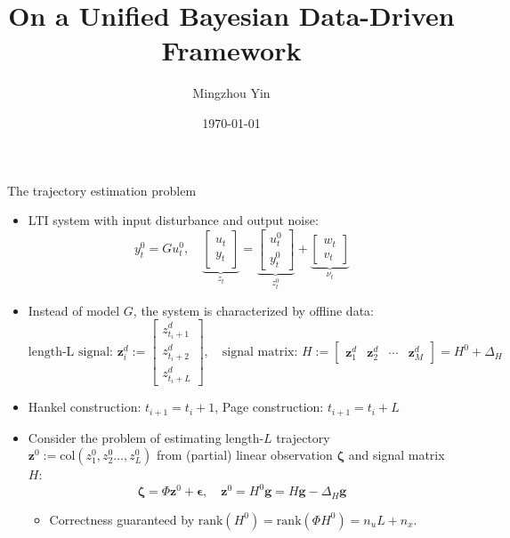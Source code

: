 \documentclass[smaller,aspectratio=169]{beamer}        %
\author[M Yin]{Mingzhou Yin}
\title{On a Unified Bayesian Data-Driven Framework}
\date{\today}
\newcommand{\col}[1]{\mathrm{col}\left(#1\right)}
\newcommand{\rank}[1]{\mathrm{rank}\left(#1\right)}
\begin{document}
\maketitle

\begin{frame}[fragile]{The trajectory estimation problem}
\begin{itemize}
    \item LTI system with input disturbance and output noise:
    \[y_t^0=Gu_t^0,\quad
    \underbrace{\begin{bmatrix}
        u_t\\y_t
    \end{bmatrix}}_{z_t}=
    \underbrace{\begin{bmatrix}
        u_t^0\\y_t^0
    \end{bmatrix}}_{z_t^0}+
    \underbrace{\begin{bmatrix}
        w_t\\v_t
    \end{bmatrix}}_{\nu_t}
    \]
    
    \vspace{-1em}
    
    \item Instead of model $G$, the system is characterized by offline data:
    \[\text{length-L signal: }\mathbf{z}^d_i := \begin{bmatrix}
        z^d_{t_i+1}\\z^d_{t_i+2}\\z^d_{t_i+L}
    \end{bmatrix},\quad\text{signal matrix: }H:= \begin{bmatrix}\mathbf{z}^d_1&\mathbf{z}^d_2&\cdots&\mathbf{z}^d_M\end{bmatrix}=H^0+\Delta_H\]
    \item Hankel construction: $t_{i+1}=t_i+1$, Page construction: $t_{i+1}=t_i+L$
    \pause
    \item Consider the problem of estimating length-$L$ trajectory $\mathbf{z}^0 := \col{z_1^0,z_2^0\dots,z_L^0}$ from (partial) linear observation $\boldsymbol{\zeta}$ and signal matrix $H$:
    \[\boldsymbol{\zeta} = \Phi\mathbf{z}^0 + \boldsymbol{\epsilon},\quad \mathbf{z}^0=H^0\mathbf{g}=H\mathbf{g}-\Delta_H\mathbf{g}\]
    
    \vspace{-0.5em}
    
    \begin{itemize}
        \item Correctness guaranteed by $\rank{H^0}=\rank{\Phi H^0}=n_uL+n_x$.
    \end{itemize}
\end{itemize}
\end{frame}
\end{document}
